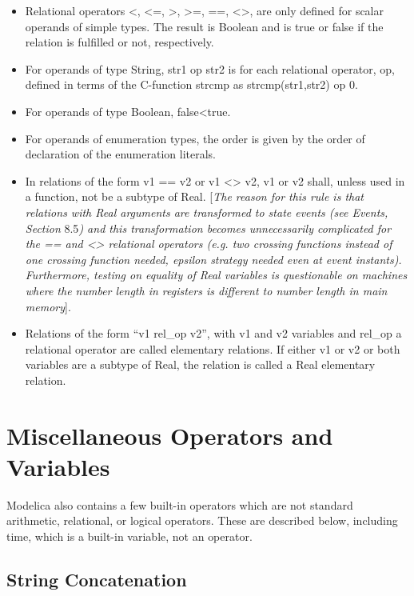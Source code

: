 \documentclass[10pt,a4paper]{report}
\begin{document}
\begin{itemize}
\item
  Relational operators \textless{}, \textless{}=, \textgreater{},
  \textgreater{}=, ==, \textless{}\textgreater{}, are only defined for
  scalar operands of simple types. The result is Boolean and is true or
  false if the relation is fulfilled or not, respectively.
\item
  For operands of type String, str1 op str2 is for each relational
  operator, op, defined in terms of the C-function strcmp as
  strcmp(str1,str2) op 0.
\item
  For operands of type Boolean, false\textless{}true.
\item
  For operands of enumeration types, the order is given by the order of
  declaration of the enumeration literals.
\item
  In relations of the form v1 == v2 or v1 \textless{}\textgreater{} v2,
  v1 or v2 shall, unless used in a function, not be a subtype of Real.
  {[}\emph{The reason for this rule is that relations with Real
  arguments are transformed to state events (see Events, Section}
  8.5\emph{) and this transformation becomes unnecessarily complicated
  for the == and \textless{}\textgreater{} relational operators (e.g.
  two crossing functions instead of one crossing function needed,
  epsilon strategy needed even at event instants). Furthermore, testing
  on equality of Real variables is questionable on machines where the
  number length in registers is different to number length in main
  memory}{]}.
\item
  Relations of the form ``v1 rel\_op v2'', with v1 and v2 variables and
  rel\_op a relational operator are called elementary relations. If
  either v1 or v2 or both variables are a subtype of Real, the relation
  is called a Real elementary relation.
\end{itemize}

 \section{Miscellaneous Operators and Variables}


Modelica also contains a few built-in operators which are not standard
arithmetic, relational, or logical operators. These are described below,
including time, which is a built-in variable, not an operator.

\subsection{String Concatenation}
\end{document}
